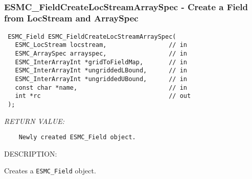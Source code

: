  
\mbox{}\hrulefill\ 
 
\subsubsection [ESMC\_FieldCreateLocStreamArraySpec] {ESMC\_FieldCreateLocStreamArraySpec - Create a Field from LocStream and ArraySpec}


  
\begin{verbatim} ESMC_Field ESMC_FieldCreateLocStreamArraySpec(
   ESMC_LocStream locstream,                 // in
   ESMC_ArraySpec arrayspec,                 // in
   ESMC_InterArrayInt *gridToFieldMap,       // in
   ESMC_InterArrayInt *ungriddedLBound,      // in
   ESMC_InterArrayInt *ungriddedUBound,      // in
   const char *name,                         // in
   int *rc                                   // out
 );
 \end{verbatim}{\em RETURN VALUE:}
\begin{verbatim}    Newly created ESMC_Field object.\end{verbatim}
{\sf DESCRIPTION:\\ }


  
    Creates a {\tt ESMC\_Field} object.
  
